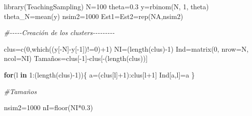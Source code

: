 \documentclass[
  12pt,
]{book}
\newenvironment{Shaded}{\begin{snugshade}}{\end{snugshade}}
\newcommand{\AttributeTok}[1]{\textcolor[rgb]{0.77,0.63,0.00}{#1}}
\newcommand{\CommentTok}[1]{\textcolor[rgb]{0.56,0.35,0.01}{\textit{#1}}}
\newcommand{\ConstantTok}[1]{\textcolor[rgb]{0.00,0.00,0.00}{#1}}
\newcommand{\ControlFlowTok}[1]{\textcolor[rgb]{0.13,0.29,0.53}{\textbf{#1}}}
\newcommand{\DecValTok}[1]{\textcolor[rgb]{0.00,0.00,0.81}{#1}}
\newcommand{\FloatTok}[1]{\textcolor[rgb]{0.00,0.00,0.81}{#1}}
\newcommand{\FunctionTok}[1]{\textcolor[rgb]{0.00,0.00,0.00}{#1}}
\newcommand{\NormalTok}[1]{#1}
\newcommand{\OtherTok}[1]{\textcolor[rgb]{0.56,0.35,0.01}{#1}}
\newcommand{\SpecialCharTok}[1]{\textcolor[rgb]{0.00,0.00,0.00}{#1}}
\begin{document}
\begin{Shaded}
\begin{Highlighting}[]
\FunctionTok{library}\NormalTok{(TeachingSampling)}
\NormalTok{N}\OtherTok{=}\DecValTok{100}
\NormalTok{theta}\OtherTok{=}\FloatTok{0.3}
\NormalTok{y}\OtherTok{=}\FunctionTok{rbinom}\NormalTok{(N, }\DecValTok{1}\NormalTok{, theta)}
\NormalTok{theta\_N}\OtherTok{=}\FunctionTok{mean}\NormalTok{(y)}
\NormalTok{nsim2}\OtherTok{=}\DecValTok{1000}
\NormalTok{Est1}\OtherTok{=}\NormalTok{Est2}\OtherTok{=}\FunctionTok{rep}\NormalTok{(}\ConstantTok{NA}\NormalTok{,nsim2)}

\CommentTok{\#{-}{-}{-}{-}{-}Creación de los clusters{-}{-}{-}{-}{-}{-}{-}{-}{-}}

\NormalTok{clus}\OtherTok{=}\FunctionTok{c}\NormalTok{(}\DecValTok{0}\NormalTok{,}\FunctionTok{which}\NormalTok{((y[}\SpecialCharTok{{-}}\NormalTok{N]}\SpecialCharTok{{-}}\NormalTok{y[}\SpecialCharTok{{-}}\DecValTok{1}\NormalTok{])}\SpecialCharTok{!=}\DecValTok{0}\NormalTok{)}\SpecialCharTok{+}\DecValTok{1}\NormalTok{)}
\NormalTok{NI}\OtherTok{=}\NormalTok{(}\FunctionTok{length}\NormalTok{(clus)}\SpecialCharTok{{-}}\DecValTok{1}\NormalTok{)}
\NormalTok{Ind}\OtherTok{=}\FunctionTok{matrix}\NormalTok{(}\DecValTok{0}\NormalTok{, }\AttributeTok{nrow=}\NormalTok{N, }\AttributeTok{ncol=}\NormalTok{NI)}
\NormalTok{Tamaños}\OtherTok{=}\NormalTok{clus[}\SpecialCharTok{{-}}\DecValTok{1}\NormalTok{]}\SpecialCharTok{{-}}\NormalTok{clus[}\SpecialCharTok{{-}}\NormalTok{(}\FunctionTok{length}\NormalTok{(clus))]}

\ControlFlowTok{for}\NormalTok{(l }\ControlFlowTok{in} \DecValTok{1}\SpecialCharTok{:}\NormalTok{(}\FunctionTok{length}\NormalTok{(clus)}\SpecialCharTok{{-}}\DecValTok{1}\NormalTok{))\{}
\NormalTok{a}\OtherTok{=}\NormalTok{(clus[l]}\SpecialCharTok{+}\DecValTok{1}\NormalTok{)}\SpecialCharTok{:}\NormalTok{clus[l}\SpecialCharTok{+}\DecValTok{1}\NormalTok{]}
\NormalTok{Ind[a,l]}\OtherTok{=}\NormalTok{a}
\NormalTok{\}}

\CommentTok{\#Tamaños}

\NormalTok{nsim2}\OtherTok{=}\DecValTok{1000}
\NormalTok{nI}\OtherTok{=}\FunctionTok{floor}\NormalTok{(NI}\SpecialCharTok{*}\FloatTok{0.3}\NormalTok{)}


\end{Highlighting}
\end{Shaded}
\end{document}

